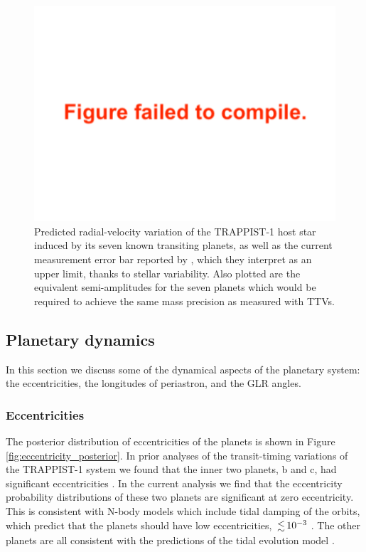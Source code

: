 \documentclass[fleqn,usenatbib]{mnras} %
\begin{document}
\begin{figure}
    \centering
    \includegraphics[width=\hsize]{figures/Equivalent_RV_precision.pdf}
    \caption{Predicted radial-velocity variation of the TRAPPIST-1 host star
    induced by its seven known transiting planets, as well as the current
    measurement error bar reported by \citet{Hirano2020}, which they interpret
    as an upper limit, thanks to stellar variability.  Also plotted are
    the equivalent semi-amplitudes for the seven planets which would be required
    to achieve the same mass precision as measured with TTVs.}
    \label{fig:rv_forecast}
\end{figure}

\subsection{Planetary dynamics}



In this section we discuss some of the dynamical aspects of the planetary system: the  eccentricities, the longitudes of periastron, and the GLR angles. 

\subsubsection{Eccentricities}

The posterior distribution of eccentricities of the planets is shown
in Figure \ref{fig:eccentricity_posterior}.  In prior analyses of
the transit-timing variations of the TRAPPIST-1 system we found that
the inner two planets, b and c, had significant eccentricities \citep{Grimm2018}.
In the current analysis we find that the eccentricity probability
distributions of these two planets are significant at zero eccentricity.
This is consistent with N-body models which include tidal damping of
the orbits, which predict that the planets should have low eccentricities,
$\la 10^{-3}$ \citep{Luger2017a,Turbet2018}.  The other planets are
all consistent with the predictions of the tidal evolution model
\citep{Luger2017b}. 
\end{document}
